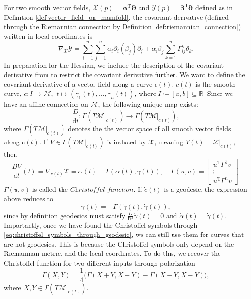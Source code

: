 For two smooth vector fields, $\mathcal{X}(p)=\boldsymbol{\alpha}^{\mathrm{T}}\boldsymbol{\partial}$ and $\mathcal{Y}(p)=\boldsymbol{\beta}^{\mathrm{T}}\boldsymbol{\partial}$ defined as in Definition \ref{def:vector_field_on_manifold}, the covariant derivative (defined through the Riemannian connection by Definition \ref{def:riemannian_connection}) written in local coordinates is
\begin{equation*}
    \nabla_{\mathcal{X}}\mathcal{Y}=\sum\limits_{i=1}^{n}\sum\limits_{j=1}^{n}\alpha_{i}\partial_{i}(\beta_{j})\partial_{j}+\alpha_{i}\beta_{j}\sum\limits_{k=1}^{n}\Gamma_{ij}^{k}\partial_{k}.
\end{equation*}
In preparation for the Hessian, we include the description of the covariant derivative from \cite[p.~96]{Tu2017} to restrict the covariant derivative further. We want to define the covariant derivative of a vector field along a curve $c(t)$. $c(t)$ is the smooth curve, $c\colon I\xrightarrow{}\mathcal{M},$ $t\mapsto(\gamma_{1}(t), \dots, \gamma_{n}(t))$, where $I \coloneqq [a,b]\subseteq \mathbb{R}$. Since we have an affine connection on $\mathcal{M}$, the following unique map exists:
\begin{equation*}
    \frac{D}{\mathrm{d}t}\colon \Gamma(T \mathcal{M}|_{c(t)})\xrightarrow{}\Gamma(T \mathcal{M}|_{c(t)}),
\end{equation*}
where $\Gamma(T \mathcal{M}|_{c(t)})$ denotes the the vector space of all smooth vector fields along $c(t)$. If $V\in \Gamma(T \mathcal{M}|_{c(t)})$ is induced by $\mathcal{X}$, meaning $V(t)=\mathcal{X}|_{c(t)}$, then
\begin{equation*}
    \frac{DV}{\mathrm{d}t}(t)=\nabla_{\dot{c}(t)}\mathcal{X}=\dot{\alpha}(t)+\Gamma(\alpha(t), \dot{\gamma}(t)),\quad \Gamma(u,v)=\begin{bmatrix}u ^{\mathrm{T}}\Gamma^{1}v \\ \vdots \\ u ^{\mathrm{T}}\Gamma^{n}v\end{bmatrix}.
\end{equation*}
$\Gamma(u,v)$ is called the $\textit{Christoffel function}$. If $\dot{c}(t)$ is a geodesic, the expression above reduces to 
\begin{equation}\label{eq:christoffel_symbols_through_geodesic}
    \ddot{\gamma}(t)=-\Gamma(\dot{\gamma}(t),\dot{\gamma}(t)),
\end{equation}
since by definition geodesics must satisfy $\tfrac{D}{\mathrm{D}t}\dot{\gamma}(t)=0$ and $\dot{\alpha}(t)=\dot{\gamma}(t)$. Importantly, once we have found the Christoffel symbols through \eqref{eq:christoffel_symbols_through_geodesic}, we can still use them for curves that are not geodesics. This is because the Christoffel symbols only depend on the Riemannian metric, and the local coordinates. To do this, we recover the Christoffel function for two different inputs through polarization \cite[p.~312]{Edelman1998} 
\begin{equation*}
    \Gamma(X,Y)=\frac{1}{4}\big(\Gamma(X+Y,X+Y)-\Gamma(X-Y,X-Y)\big),
\end{equation*}
where $X,Y\in \Gamma(T \mathcal{M}|_{c(t)})$. 


